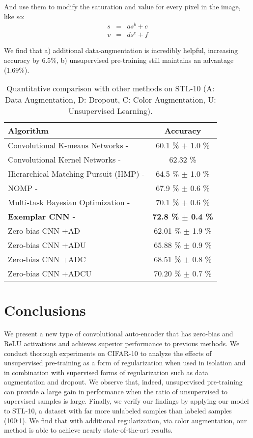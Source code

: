 \documentclass{article} \usepackage{iclr2015,times}
\begin{document}
And use them to modify the saturation and value for every pixel in the image, like so:
\begin{eqnarray}
s &=& a s^b + c \\
v &=& d s^e + f
\end{eqnarray}

We find that a) additional data-augmentation is incredibly helpful, increasing accuracy by 6.5\%, b) unsupervised pre-training still maintains an advantage (1.69\%).

\begin{table}
\begin{center}
    \caption{Quantitative comparison with other methods on STL-10 (A: Data Augmentation, D: Dropout, C: Color Augmentation, U: Unsupervised Learning).}
    \label{tab:method_comp_stl}
    \begin{tabular}{ |l | c |}
    \hline
    Algorithm & Accuracy \\ \hline    
    Convolutional K-means Networks - \citet{coates2011selecting} & 60.1 \% $\pm$ 1.0 \% \\ Convolutional Kernel Networks - \citet{Mairal2014convolutional} & 62.32 \% \\ Hierarchical Matching Pursuit (HMP) - \citet{bo2013unsupervised} & 64.5 \% $\pm$ 1.0 \% \\ NOMP - \citet{lin2014stable} & 67.9 \% $\pm$ 0.6 \% \\Multi-task Bayesian Optimization - \citet{swersky2013multi} & 70.1 \% $\pm$ 0.6 \% \\ \textbf{Exemplar CNN - \citet{dosovitskiy2014discriminative}} & \textbf{72.8 \% $\pm$ 0.4 \% }\\ \hline
    \hline
     Zero-bias CNN +AD &  62.01 \% $\pm$ 1.9 \% \\ \hline
     Zero-bias CNN +ADU &  65.88 \% $\pm$ 0.9 \% \\ \hline
     Zero-bias CNN +ADC & 68.51 \% $\pm$ 0.8 \% \\ \hline
     Zero-bias CNN +ADCU & 70.20 \% $\pm$ 0.7 \% \\ 
    \hline
    \end{tabular}
\end{center}
\end{table}
 
\section{Conclusions}
\label{sec:conclusions}
We present a new type of convolutional auto-encoder that has zero-bias and ReLU activations and achieves superior performance to previous methods.
We conduct thorough experiments on CIFAR-10 to analyze the effects of unsupervised pre-training as a form of regularization when used in isolation and in combination with supervised forms of regularization such as data augmentation and dropout. We observe that, indeed, unsupervised pre-training can provide a large gain in performance when the ratio of unsupervised to supervised samples is large. 
Finally, we verify our findings by applying our model to STL-10, a dataset with far more unlabeled samples than labeled samples (100:1). We find that with additional regularization, via color augmentation, our method is able to achieve nearly state-of-the-art results. 
\end{document}
